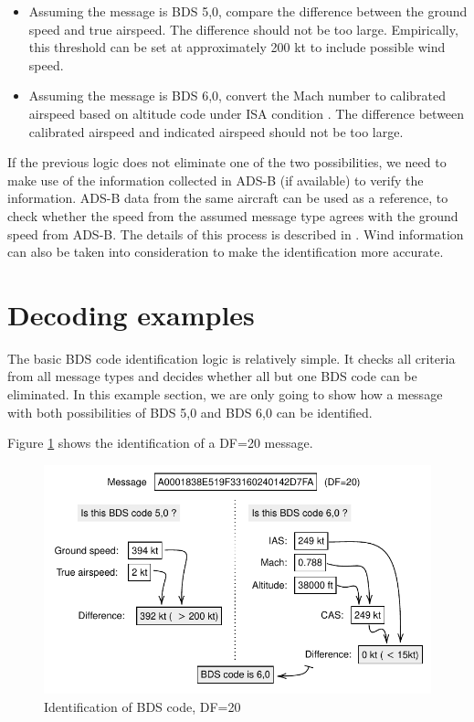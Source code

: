 \begin{itemize}
    \item Assuming the message is BDS 5,0, compare the difference between the ground speed and true airspeed. The difference should not be too large. Empirically, this threshold can be set at approximately 200 kt to include possible wind speed. 
    \item Assuming the message is BDS 6,0, convert the Mach number to calibrated airspeed based on altitude code under ISA condition \cite{young2017}. The difference between calibrated airspeed and indicated airspeed should not be too large.
\end{itemize}

If the previous logic does not eliminate one of the two possibilities, we need to make use of the information collected in ADS-B (if available) to verify the information. ADS-B data from the same aircraft can be used as a reference, to check whether the speed from the assumed message type agrees with the ground speed from ADS-B. The details of this process is described in \cite{sun2019pymodes}. Wind information can also be taken into consideration to make the identification more accurate.


\section{Decoding examples}

The basic BDS code identification logic is relatively simple. It checks all criteria from all message types and decides whether all but one BDS code can be eliminated. In this example section, we are only going to show how a message with both possibilities of BDS 5,0 and BDS 6,0 can be identified.


Figure \ref{fig:bds_bds_infer_example_1} shows the identification of a DF=20 message. 

\begin{figure}[ht]
\centering
  \includegraphics[scale=0.8]{figures/mode_s/bds_infer_example_1.pdf}
\caption{Identification of BDS code, DF=20}
\label{fig:bds_bds_infer_example_1}
\end{figure}

